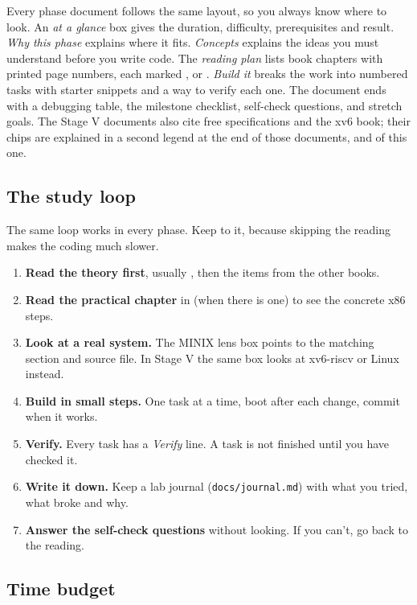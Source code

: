 \documentclass[11pt,a4paper]{article}
\begin{document}
Every phase document follows the same layout, so you always know where to look. An \emph{at a glance} box gives the
duration, difficulty, prerequisites and result. \emph{Why this phase} explains where it fits. \emph{Concepts} explains
the ideas you must understand before you write code. The \emph{reading plan} lists book chapters with printed page
numbers, each marked \must, \should or \could. \emph{Build it} breaks the work into numbered tasks with starter
snippets and a way to verify each one. The document ends with a debugging table, the milestone checklist, self-check
questions, and stretch goals. The Stage V documents also cite free specifications and the xv6 book; their chips
are explained in a second legend at the end of those documents, and of this one.

\subsection{The study loop}

The same loop works in every phase. Keep to it, because skipping the reading makes the coding much slower.

\begin{enumerate}
  \item \textbf{Read the theory first}, usually \OSTEP, then the \must items from the other books.
  \item \textbf{Read the practical chapter} in \LOB (when there is one) to see the concrete x86 steps.
  \item \textbf{Look at a real system.} The MINIX lens box points to the matching \OSDI section and source file.
    In Stage V the same box looks at xv6-riscv or Linux instead.
  \item \textbf{Build in small steps.} One task at a time, boot after each change, commit when it works.
  \item \textbf{Verify.} Every task has a \emph{Verify} line. A task is not finished until you have checked it.
  \item \textbf{Write it down.} Keep a lab journal (\texttt{docs/journal.md}) with what you tried, what broke and why.
  \item \textbf{Answer the self-check questions} without looking. If you can't, go back to the reading.
\end{enumerate}

\subsection{Time budget}
\end{document}
